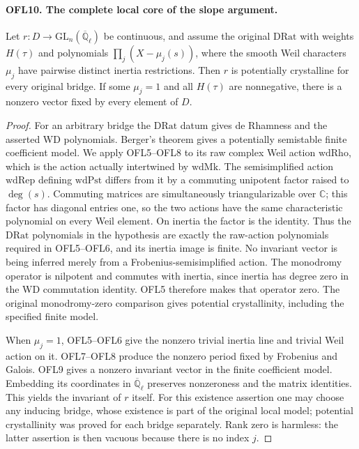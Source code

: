 \paragraph{OFL10. The complete local core of the slope argument.}
\label{claim:OFL10}
Let \(r:D\to\mathrm{GL}_n(\overline{\mathbb Q}_\ell)\)
be continuous, and assume the original \(\mathrm{DRat}\) with
weights \(H(\tau)\) and polynomials
\(\prod_j(X-\mu_j(s))\), where the smooth Weil characters
\(\mu_j\) have pairwise distinct inertia restrictions.  Then
\(r\) is potentially crystalline for every original bridge.
If some \(\mu_j=1\) and all \(H(\tau)\) are nonnegative,
there is a nonzero vector fixed by every element of \(D\).
\begin{proof}
For an arbitrary bridge the \(\mathrm{DRat}\) datum gives
de Rhamness and the asserted WD polynomials.  Berger's theorem
gives a potentially semistable finite coefficient model.  We
apply OFL5--OFL8 to its raw complex Weil action
\(\mathrm{wdRho}\), which is the action actually intertwined
by \(\mathrm{wdMk}\).  The semisimplified action
\(\mathrm{wdRep}\) defining \(\mathrm{wdPst}\) differs from
it by a commuting unipotent factor raised to \(\deg(s)\).
Commuting matrices are simultaneously triangularizable over
\(\mathbb C\); this factor has diagonal entries one, so the
two actions have the same characteristic polynomial on every
Weil element.  On inertia the factor is the identity.  Thus the
\(\mathrm{DRat}\) polynomials in the hypothesis are exactly
the raw-action polynomials required in OFL5--OFL6, and its
inertia image is finite.  No invariant vector is being inferred
merely from a Frobenius-semisimplified action.
The monodromy operator is
nilpotent and commutes with inertia, since inertia has degree zero
in the WD commutation identity.  OFL5 therefore makes that
operator zero.  The original monodromy-zero comparison gives
potential crystallinity, including the specified finite model.

When \(\mu_j=1\), OFL5--OFL6 give the nonzero trivial
inertia line and trivial Weil action on it.  OFL7--OFL8 produce
the nonzero period fixed by Frobenius and Galois.  OFL9 gives a
nonzero invariant vector in the finite coefficient model.
Embedding its coordinates in \(\overline{\mathbb Q}_\ell\)
preserves nonzeroness and the matrix identities.  This yields
the invariant of \(r\) itself.  For this existence assertion
one may choose any inducing bridge, whose existence is part of
the original local model; potential crystallinity was proved for
each bridge separately.  Rank zero is harmless: the latter
assertion is then vacuous because there is no index \(j\).
\end{proof}

